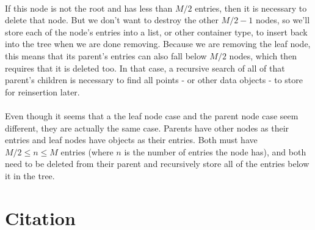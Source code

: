 \documentclass{article}
\begin{document}
\paragraph{}
If this node is not the root and has less than $M/2$ entries, then it is necessary to delete that node. But we don't want to destroy
the other $M/2 - 1$ nodes, so we'll store each of the node's entries into a list, or other container type, to insert back into
the tree when we are done removing. Because we are removing the leaf node, this means that its parent's entries can also fall below
$M/2$ nodes, which then requires that it is deleted too. In that case, a recursive search of all of that parent's children is necessary
to find all points - or other data objects - to store for reinsertion later.
\paragraph{}
Even though it seems that a the leaf node case and the parent node case seem different, they are actually the same case. Parents have
other nodes as their entries and leaf nodes have objects as their entries. Both must have $M/2 \le n \le M$ entries (where $n$ is the number
of entries the node has), and both need to be deleted from their parent and recursively store all of the entries below it in the tree.

\section{Citation}


\end{document}
